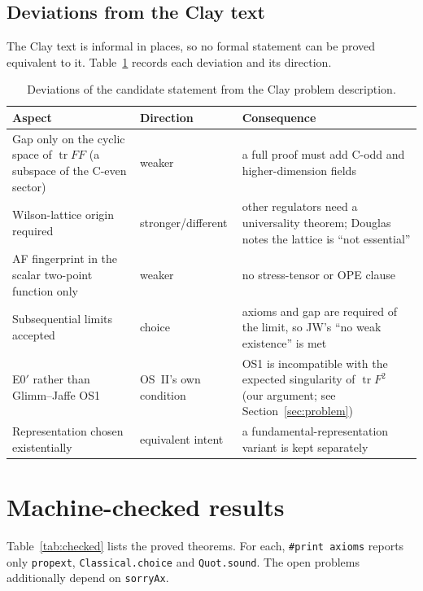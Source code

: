 \documentclass[11pt]{article}
\theoremstyle{definition}
\theoremstyle{remark}
\newcommand{\tr}{\operatorname{tr}}
\newcommand{\lean}[1]{\texttt{\hyphenchar\font=-1\relax #1}}
\begin{document}
\subsection{Deviations from the Clay text}
The Clay text is informal in places, so no formal statement can be proved equivalent to it.
Table~\ref{tab:dev} records each deviation and its direction.

\begin{table}[ht]
\centering\small
\begin{tabularx}{\textwidth}{@{}p{4.3cm}p{2.7cm}X@{}}
\toprule
Aspect & Direction & Consequence \\
\midrule
Gap only on the cyclic space of $\tr F F$ (a subspace of the C-even sector) & weaker & a full proof must add C-odd and higher-dimension fields \\
Wilson-lattice origin required & stronger/different & other regulators need a universality theorem; Douglas~\cite{Douglas2004} notes the lattice is ``not essential'' \\
AF fingerprint in the scalar two-point function only & weaker & no stress-tensor or OPE clause \\
Subsequential limits accepted & choice & axioms and gap are required of the limit, so JW's ``no weak existence'' is met \\
E0$'$ rather than Glimm--Jaffe OS1 & OS~II's own condition & OS1 is incompatible with the expected singularity of $\tr F^2$ (our argument; see Section~\ref{sec:problem}) \\
Representation chosen existentially & equivalent intent & a fundamental-representation variant is kept separately \\
\bottomrule
\end{tabularx}
\caption{Deviations of the candidate statement from the Clay problem description.}
\label{tab:dev}
\end{table}

\section{Machine-checked results}\label{sec:checked}

Table~\ref{tab:checked} lists the proved theorems. For each, \lean{\#print axioms} reports only
\lean{propext}, \lean{Classical.choice} and \lean{Quot.sound}. The open problems additionally
depend on \lean{sorryAx}.
\end{document}

